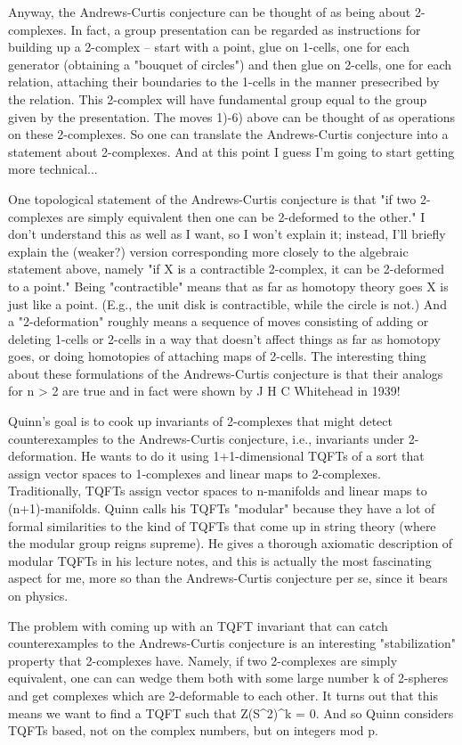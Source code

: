 Anyway, the Andrews-Curtis conjecture can be thought of as being about
2-complexes.  In fact, a group presentation can be regarded as
instructions for building up a 2-complex -- start with a point, glue on
1-cells, one for each generator (obtaining a "bouquet of circles") and
then glue on 2-cells, one for each relation, attaching their boundaries
to the 1-cells in the manner presecribed by the relation.  This
2-complex will have fundamental group equal to the group given by the
presentation.  The moves 1)-6) above can be thought of as operations on
these 2-complexes.  So one can translate the Andrews-Curtis conjecture
into a statement about 2-complexes.  And at this point I guess I'm going
to start getting more technical...

One topological statement of the Andrews-Curtis conjecture is that "if
two 2-complexes are simply equivalent then one can be 2-deformed to the
other."  I don't understand this as well as I want, so I won't explain
it; instead, I'll briefly explain the (weaker?) version corresponding
more closely to the algebraic statement above, namely "if X is a
contractible 2-complex, it can be 2-deformed to a point."  Being
"contractible" means that as far as homotopy theory goes X is just like
a point.  (E.g., the unit disk is contractible, while the circle is
not.)  And a "2-deformation" roughly means a sequence of moves
consisting of adding or deleting 1-cells or 2-cells in a way that
doesn't affect things as far as homotopy goes, or doing homotopies of
attaching maps of 2-cells.  The interesting thing about these
formulations of the Andrews-Curtis conjecture is that their analogs for
n > 2 are true and in fact were shown by J H C Whitehead in 1939!

Quinn's goal is to cook up invariants of 2-complexes that might detect
counterexamples to the Andrews-Curtis conjecture, i.e., invariants under
2-deformation.  He wants to do it using 1+1-dimensional TQFTs of a sort
that assign vector spaces to 1-complexes and linear maps to 2-complexes.
Traditionally, TQFTs assign vector spaces to n-manifolds and linear maps to
(n+1)-manifolds.  Quinn calls his TQFTs "modular" because they have a
lot of formal similarities to the kind of TQFTs that come up in string
theory (where the modular group reigns supreme).  He gives a thorough
axiomatic description of modular TQFTs in his lecture notes, and this is
actually the most fascinating aspect for me, more so than the
Andrews-Curtis conjecture per se, since it bears on physics.  

The problem with coming up with an TQFT invariant that can catch
counterexamples to the Andrews-Curtis conjecture is an interesting
"stabilization" property that 2-complexes have.  Namely, if two
2-complexes are simply equivalent, one can can wedge them both with some
large number k of 2-spheres and get complexes which are 2-deformable to
each other.  It turns out that this means we want to find a TQFT such
that Z(S^2)^k = 0.   And so Quinn considers TQFTs based, not on the
complex numbers, but on integers mod p.  

